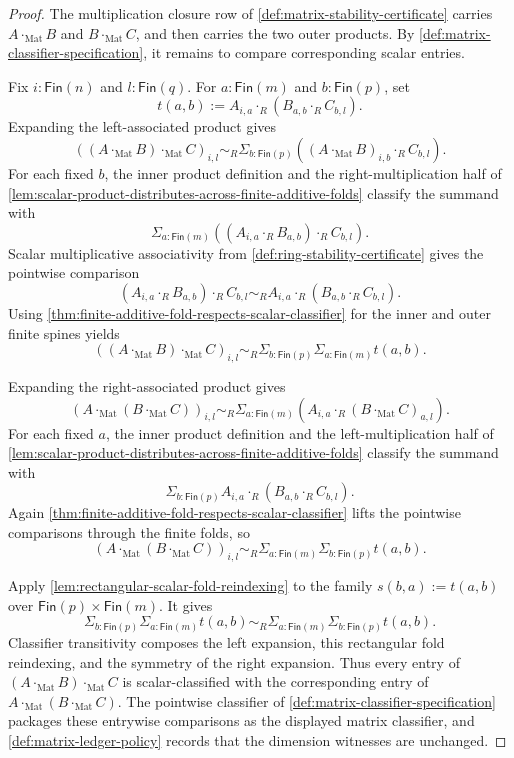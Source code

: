 \begin{proof}
The multiplication closure row of \autoref{def:matrix-stability-certificate} carries $A\cdot_{\mathrm{Mat}}B$ and $B\cdot_{\mathrm{Mat}}C$, and then carries the two outer products. By \autoref{def:matrix-classifier-specification}, it remains to compare corresponding scalar entries.

Fix $i:\mathsf{Fin}(n)$ and $l:\mathsf{Fin}(q)$. For $a:\mathsf{Fin}(m)$ and $b:\mathsf{Fin}(p)$, set
$$
t(a,b):=A_{i,a}\cdot_R(B_{a,b}\cdot_RC_{b,l}).
$$
Expanding the left-associated product gives
$$
((A\cdot_{\mathrm{Mat}}B)\cdot_{\mathrm{Mat}}C)_{i,l}
\sim_R
\Sigma_{b:\mathsf{Fin}(p)}((A\cdot_{\mathrm{Mat}}B)_{i,b}\cdot_RC_{b,l}).
$$
For each fixed $b$, the inner product definition and the right-multiplication half of \autoref{lem:scalar-product-distributes-across-finite-additive-folds} classify the summand with
$$
\Sigma_{a:\mathsf{Fin}(m)}((A_{i,a}\cdot_RB_{a,b})\cdot_RC_{b,l}).
$$
Scalar multiplicative associativity from \autoref{def:ring-stability-certificate} gives the pointwise comparison
$$
(A_{i,a}\cdot_RB_{a,b})\cdot_RC_{b,l}
\sim_R
A_{i,a}\cdot_R(B_{a,b}\cdot_RC_{b,l}).
$$
Using \autoref{thm:finite-additive-fold-respects-scalar-classifier} for the inner and outer finite spines yields
$$
((A\cdot_{\mathrm{Mat}}B)\cdot_{\mathrm{Mat}}C)_{i,l}
\sim_R
\Sigma_{b:\mathsf{Fin}(p)}\Sigma_{a:\mathsf{Fin}(m)}t(a,b).
$$

Expanding the right-associated product gives
$$
(A\cdot_{\mathrm{Mat}}(B\cdot_{\mathrm{Mat}}C))_{i,l}
\sim_R
\Sigma_{a:\mathsf{Fin}(m)}(A_{i,a}\cdot_R(B\cdot_{\mathrm{Mat}}C)_{a,l}).
$$
For each fixed $a$, the inner product definition and the left-multiplication half of \autoref{lem:scalar-product-distributes-across-finite-additive-folds} classify the summand with
$$
\Sigma_{b:\mathsf{Fin}(p)}A_{i,a}\cdot_R(B_{a,b}\cdot_RC_{b,l}).
$$
Again \autoref{thm:finite-additive-fold-respects-scalar-classifier} lifts the pointwise comparisons through the finite folds, so
$$
(A\cdot_{\mathrm{Mat}}(B\cdot_{\mathrm{Mat}}C))_{i,l}
\sim_R
\Sigma_{a:\mathsf{Fin}(m)}\Sigma_{b:\mathsf{Fin}(p)}t(a,b).
$$

Apply \autoref{lem:rectangular-scalar-fold-reindexing} to the family $s(b,a):=t(a,b)$ over $\mathsf{Fin}(p)\times\mathsf{Fin}(m)$. It gives
$$
\Sigma_{b:\mathsf{Fin}(p)}\Sigma_{a:\mathsf{Fin}(m)}t(a,b)
\sim_R
\Sigma_{a:\mathsf{Fin}(m)}\Sigma_{b:\mathsf{Fin}(p)}t(a,b).
$$
Classifier transitivity composes the left expansion, this rectangular fold reindexing, and the symmetry of the right expansion. Thus every entry of $(A\cdot_{\mathrm{Mat}}B)\cdot_{\mathrm{Mat}}C$ is scalar-classified with the corresponding entry of $A\cdot_{\mathrm{Mat}}(B\cdot_{\mathrm{Mat}}C)$. The pointwise classifier of \autoref{def:matrix-classifier-specification} packages these entrywise comparisons as the displayed matrix classifier, and \autoref{def:matrix-ledger-policy} records that the dimension witnesses are unchanged.
\end{proof}

